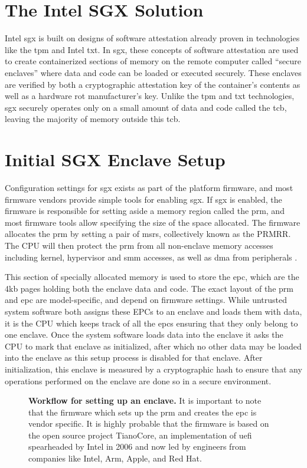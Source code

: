 \section{The Intel SGX Solution}
Intel \gls{sgx} is built on designs of software attestation already proven in technologies like the \gls{tpm} and Intel \gls{txt}. In \gls{sgx}, these concepts of software attestation are used to create containerized sections of memory on the remote computer called ``secure enclaves'' where data and code can be loaded or executed securely. These enclaves are verified by both a cryptographic attestation key of the container’s contents as well as a hardware \gls{rot} manufacturer’s key. Unlike the \gls{tpm} and \gls{txt} technologies, \gls{sgx} securely operates only on a small amount of data and code called the \gls{tcb}, leaving the majority of memory outside this \gls{tcb}.
\section{Initial SGX Enclave Setup}
Configuration settings for \gls{sgx} exists as part of the platform firmware, and most firmware vendors provide simple tools for enabling \gls{sgx}. If \gls{sgx} is enabled, the firmware is responsible for setting aside a memory region called the \gls{prm}, and most firmware tools allow specifying the size of the space allocated. The firmware allocates the \gls{prm} by setting a pair of \glspl{msr}, collectively known as the PRMRR. The CPU will then protect the \gls{prm} from all non-enclave memory accesses including kernel, hypervisor and \gls{smm} accesses, as well as \gls{dma} from peripherals \cite{Costan2016}. 

This section of specially allocated memory is used to store the \gls{epc}, which are the 4kb pages holding both the enclave data and code. The exact layout of the \gls{prm} and \gls{epc} are model-specific, and depend on firmware settings. While untrusted system software both assigns these EPCs to an enclave and loads them with data, it is the CPU which keeps track of all the \gls{epc}s ensuring that they only belong to one enclave. Once the system software loads data into the enclave it asks the CPU to mark that enclave as initialized, after which no other data may be loaded into the enclave as this setup process is disabled for that enclave. After initialization, this enclave is measured by a cryptographic hash to ensure that any operations performed on the enclave are done so in a secure environment.

\begin{figure}[hb]
\centering

\caption[Setting Up Intel SGX]{\textbf{Workflow for setting up an enclave.} It is important to note that the firmware which sets up the \gls{prm} and creates the \gls{epc} is vendor specific. It is highly probable that the firmware is based on the open source project TianoCore, an implementation of \gls{uefi} spearheaded by Intel in 2006 and now led by engineers from companies like Intel, Arm, Apple, and Red Hat.}
\label{fig:sgx-setup}
\end{figure}


